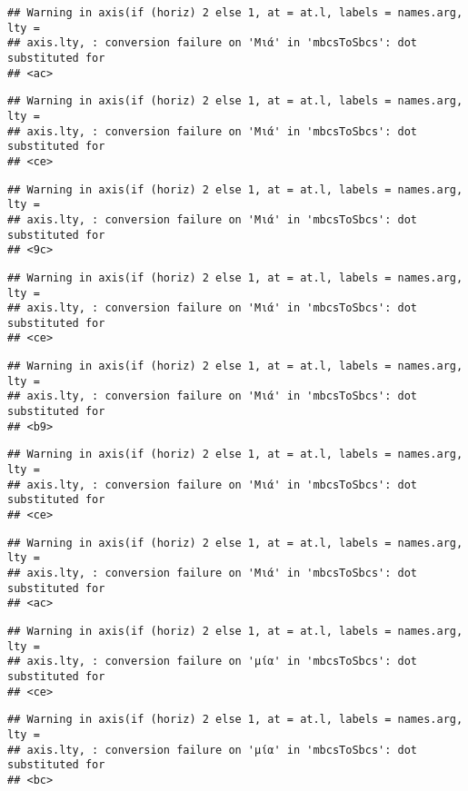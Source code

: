 \documentclass[
]{article}
\begin{document}
\begin{verbatim}
## Warning in axis(if (horiz) 2 else 1, at = at.l, labels = names.arg, lty =
## axis.lty, : conversion failure on 'Μιά' in 'mbcsToSbcs': dot substituted for
## <ac>
\end{verbatim}

\begin{verbatim}
## Warning in axis(if (horiz) 2 else 1, at = at.l, labels = names.arg, lty =
## axis.lty, : conversion failure on 'Μιά' in 'mbcsToSbcs': dot substituted for
## <ce>
\end{verbatim}

\begin{verbatim}
## Warning in axis(if (horiz) 2 else 1, at = at.l, labels = names.arg, lty =
## axis.lty, : conversion failure on 'Μιά' in 'mbcsToSbcs': dot substituted for
## <9c>
\end{verbatim}

\begin{verbatim}
## Warning in axis(if (horiz) 2 else 1, at = at.l, labels = names.arg, lty =
## axis.lty, : conversion failure on 'Μιά' in 'mbcsToSbcs': dot substituted for
## <ce>
\end{verbatim}

\begin{verbatim}
## Warning in axis(if (horiz) 2 else 1, at = at.l, labels = names.arg, lty =
## axis.lty, : conversion failure on 'Μιά' in 'mbcsToSbcs': dot substituted for
## <b9>
\end{verbatim}

\begin{verbatim}
## Warning in axis(if (horiz) 2 else 1, at = at.l, labels = names.arg, lty =
## axis.lty, : conversion failure on 'Μιά' in 'mbcsToSbcs': dot substituted for
## <ce>
\end{verbatim}

\begin{verbatim}
## Warning in axis(if (horiz) 2 else 1, at = at.l, labels = names.arg, lty =
## axis.lty, : conversion failure on 'Μιά' in 'mbcsToSbcs': dot substituted for
## <ac>
\end{verbatim}

\begin{verbatim}
## Warning in axis(if (horiz) 2 else 1, at = at.l, labels = names.arg, lty =
## axis.lty, : conversion failure on 'μία' in 'mbcsToSbcs': dot substituted for
## <ce>
\end{verbatim}

\begin{verbatim}
## Warning in axis(if (horiz) 2 else 1, at = at.l, labels = names.arg, lty =
## axis.lty, : conversion failure on 'μία' in 'mbcsToSbcs': dot substituted for
## <bc>
\end{verbatim}
\end{document}
